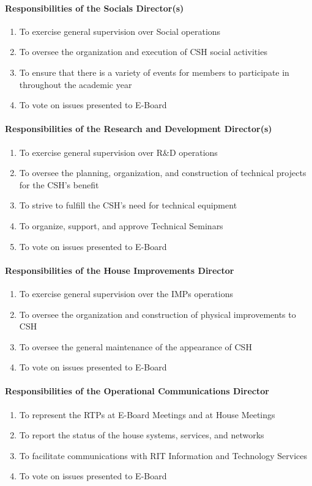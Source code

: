 \documentclass{article}
\newcommand{\asubsubsection}[1]{\paragraph{#1} \label{#1}}
\begin{document}
\asubsubsection{Responsibilities of the Socials Director(s)}
\begin{enumerate}
	\item To exercise general supervision over Social operations
	\item To oversee the organization and execution of CSH social activities
	\item To ensure that there is a variety of events for members to participate in throughout the academic year
	\item To vote on issues presented to E-Board
\end{enumerate}

\asubsubsection{Responsibilities of the Research and Development Director(s)}
\begin{enumerate}
	\item To exercise general supervision over R\&D operations
	\item To oversee the planning, organization, and construction of technical projects for the CSH's benefit
	\item To strive to fulfill the CSH's need for technical equipment
	\item To organize, support, and approve Technical Seminars
	\item To vote on issues presented to E-Board
\end{enumerate}

\asubsubsection{Responsibilities of the House Improvements Director}
\begin{enumerate}
	\item To exercise general supervision over the IMPs operations
	\item To oversee the organization and construction of physical improvements to CSH
	\item To oversee the general maintenance of the appearance of CSH
	\item To vote on issues presented to E-Board
\end{enumerate}

\asubsubsection{Responsibilities of the Operational Communications Director}
\begin{enumerate}
	\item To represent the RTPs at E-Board Meetings and at House Meetings
	\item To report the status of the house systems, services, and networks
	\item To facilitate communications with RIT Information and Technology Services
	\item To vote on issues presented to E-Board
\end{enumerate}
\end{document}
